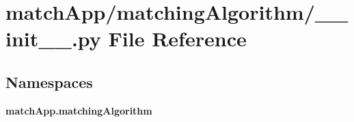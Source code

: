 \section{match\+App/matching\+Algorithm/\+\_\+\+\_\+init\+\_\+\+\_\+.py File Reference}
\label{match_app_2matching_algorithm_2____init_____8py}
\subsection*{Namespaces}
\begin{DoxyCompactItemize}
\item 
 {\bf match\+App.\+matching\+Algorithm}
\end{DoxyCompactItemize}
